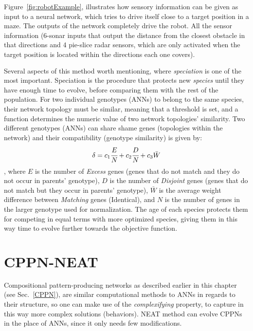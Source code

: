 Figure~\ref{fig:robotExample}, illustrates how sensory information can be given as input to a neural network, which tries to drive itself close to a target position in a maze. The outputs of the network completely drive the robot. All the sensor information (6-sonar inputs that output the distance from the closest obstacle in that directions and 4 pie-slice radar sensors, which are only activated when the target position is located within the directions each one covers).

Several aspects of this method worth mentioning, where \emph{speciation} is one of the most important. Speciation is the procedure that protects new \emph{species} until they have enough time to evolve, before comparing them with the rest of the population. For two individual genotypes (ANNs) to belong to the same species, their network topology must be similar, meaning that a threshold is set, and a function determines the numeric value of two network topologies' similarity. Two different genotypes (ANNs) can share shame genes (topologies within the network) and their compatibility (genotype similarity) is given by:
\begin{equation}
\label{CompatibilityEquation}
\delta = c_1 \cfrac{E}{N} + c_2 \cfrac{D}{N} + c_3 \bar{W}
\end{equation}
, where $E$ is the number of \emph{Excess} genes (genes that do not match and they do not occur in parents' genotype), $D$ is the number of \emph{Disjoint} genes (genes that do not match but they occur in parents' genotype), $\bar{W}$ is the average weight difference between \emph{Matching} genes (Identical), and $N$ is the number of genes in the larger genotype used for normalization.
The age of each species protects them for competing in equal terms with more optimized species, giving them in this way time to evolve further towards the objective function.



\section{CPPN-NEAT}

Compositional pattern-producing networks as described earlier in this chapter (see Sec.~\ref{CPPN}), are similar computational methods to ANNs in regards to their structure, so one can make use of the \emph{complexifying} property, to capture in this way more complex solutions (behaviors). NEAT method can evolve CPPNs in the place of ANNs, since it only needs few modifications. 

